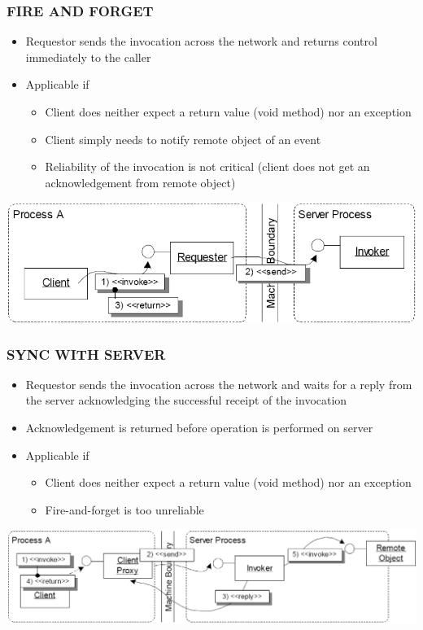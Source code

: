 \documentclass[10pt]{article}
\begin{document}
\subsubsection{FIRE AND FORGET}
\begin{itemize}
	\item Requestor sends the invocation across the network and returns control immediately to the caller
	\item Applicable if
		\begin{itemize}
			\item Client does neither expect a return value (void method) nor an exception
			\item Client simply needs to notify remote object of an event
			\item Reliability of the invocation is not critical (client does not get an acknowledgement from remote object)
		\end{itemize}
\end{itemize}
\begin{center}
	\includegraphics[scale=0.2]{images/fire-and-forget.png}
\end{center}
\subsubsection{SYNC WITH SERVER}
\begin{itemize}
	\item Requestor sends the invocation across the network and waits for a reply from the server acknowledging the successful receipt of the invocation
	\item Acknowledgement is returned before operation is performed on server
	\item Applicable if
		\begin{itemize}
			\item Client does neither expect a return value (void method) nor an exception
			\item Fire-and-forget is too unreliable
		\end{itemize}
\end{itemize}
\begin{center}
	\includegraphics[scale=0.2]{images/sync-with-server.png}
\end{center}
\end{document}
